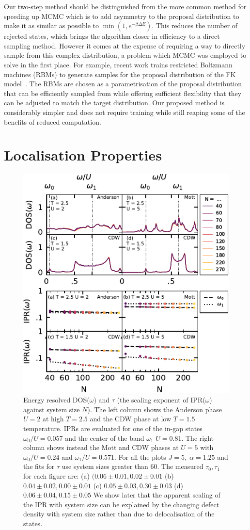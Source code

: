 Our two-step method should be distinguished from the more common method for speeding up \ac{MCMC} which is to add asymmetry to the proposal distribution to make it as similar as possible to \(\min\left(1, e^{-\beta \Delta E}\right)\). This reduces the number of rejected states, which brings the algorithm closer in efficiency to a direct sampling method. However it comes at the expense of requiring a way to directly sample from this complex distribution, a problem which \ac{MCMC} was employed to solve in the first place. For example, recent work trains restricted Boltzmann machines (RBMs) to generate samples for the proposal distribution of the \ac{FK} model~\cite{huangAcceleratedMonteCarlo2017}. The RBMs are chosen as a parametrisation of the proposal distribution that can be efficiently sampled from while offering sufficient flexibility that they can be adjusted to match the target distribution. Our proposed method is considerably simpler and does not require training while still reaping some of the benefits of reduced computation.

\section{Localisation Properties}

\begin{figure}
  \centering
    \includegraphics[width=.5\columnwidth]{figs/FK_paper/indiv_IPR}
  \caption{\label{fig:indiv_IPR} Energy resolved DOS(\(\omega\)) and \(\tau\) (the scaling exponent of IPR(\(\omega\)) against system size \(N\)). The left column shows the Anderson phase \(U = 2\) at high \(T = 2.5\) and the CDW phase at low \(T = 1.5\) temperature. IPRs are evaluated for one of the in-gap states \(\omega_0/U = 0.057\) and the center of the band \(\omega_1\) \(U = 0.81\). The right column shows instead the Mott and CDW phases at \(U = 5\) with \(\omega_0/U = 0.24\) and \(\omega_1/U = 0.571\).
  For all the plots \(J = 5,\;\alpha = 1.25\) and the fits for \(\tau\) use system sizes greater than 60. The measured \(\tau_0,\tau_1\) for each figure are: (a) \((0.06\pm0.01, 0.02\pm0.01\) (b) \(0.04\pm0.02, 0.00\pm0.01\) (c) \(0.05\pm0.03, 0.30\pm0.03\)
  (d) \(0.06\pm0.04,  0.15\pm0.05\)
  We show later that the apparent scaling of the IPR
  with system size can be explained by the changing defect density with system size rather than due to delocalisation of the states.}
\end{figure}

